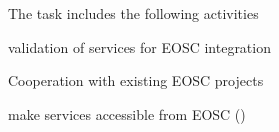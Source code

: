 \begin{task}[
  title=Collaboration with EOSC,
  id=eosc,
  lead=EGI,
  PM=33,
  wphases={12-48},
  partners={SRL,XFEL,WTT}
]
  The task includes the following activities

  \begin{compactitem}
  \item validation of services for EOSC integration
  \item Cooperation with existing EOSC projects
  \item make services accessible from EOSC
    ()
  \end{compactitem}
\end{task}
